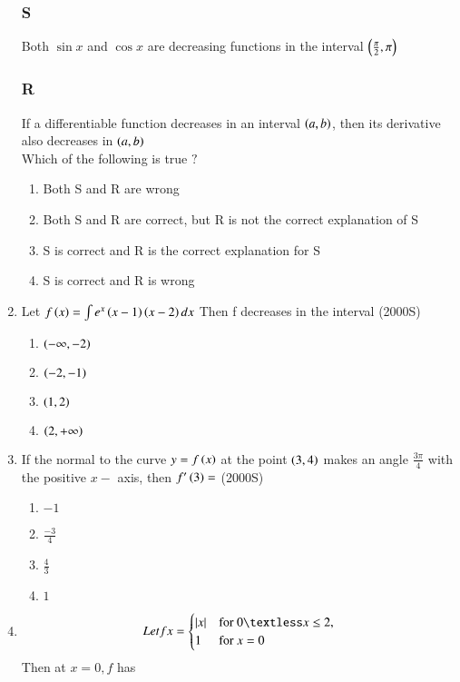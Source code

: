 \documentclass[journal,10pt,twocolumn]{IEEEtran}
\theoremstyle{remark}
\begin{document}
\begin{enumerate}[start=9]
\subsubsection*{S} Both $\sin x$ and $\cos x$ are decreasing functions in the interval $\left(\frac{\pi}{2},\pi\right)$
\subsubsection*{R} If a differentiable function decreases in an interval $\left(a,b\right)$, then its derivative also decreases in $\left(a,b\right)$\\
Which of the following is true $?$

\begin{enumerate}
    \item Both S and R are wrong
    \item Both S and R are correct, but R is not the correct explanation of S
    \item S is correct and R is the correct explanation for S
    \item S is correct and R is wrong
\end{enumerate}
\item Let $f\left(x\right)=\int{e^x\ensuremath{\left(x-1\right)}\ensuremath{\left(x-2\right)}dx}$ Then f decreases in the interval
\hfill {(2000S)} \\
\begin{enumerate}
    \item $\left(-\infty,-2\right)$
    \item $\left(-2,-1\right)$
    \item $\left(1,2\right)$
    \item $\left(2,+\infty\right)$
\end{enumerate}
\item If the normal to the curve $y=f\left(x\right)$ at the point $\left(3,4\right)$ makes an angle $\frac{3\pi}{4}$ with the positive $x-$ axis, then $f^\prime \left(3\right)=$
\hfill {(2000S)} \\
\begin{enumerate}
    \item $-1$
    \item $\frac{-3}{4}$
    \item $\frac{4}{3}$
    \item $1$
\end{enumerate}
\item $$ Let f{x} = 
\begin{cases} 
\abs{x} & \text{for } 0 \textless x \leq 2, \\
1 & \text{for } x = 0 
\end{cases}
$$
Then at $x=0, f$ has 


\end{enumerate}
\end{document}
